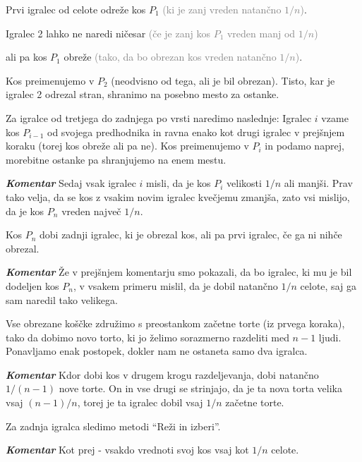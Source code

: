 \documentclass[a4paper,12pt]{article}
\begin{document}
\begin{protokol}

\item Prvi igralec od celote odreže kos $P_1$ \textcolor{gray}{(ki je zanj vreden natančno $1/n$)}.

\item Igralec 2 lahko ne naredi ničesar \textcolor{gray}{(če je zanj kos $P_1$ vreden manj od $1/n$)}

ali pa kos $P_1$ obreže \textcolor{gray}{(tako, da bo obrezan kos vreden natančno $1/n$)}.

Kos preimenujemo v $P_2$ (neodvisno od tega, ali je bil obrezan). Tisto, kar je igralec 2 odrezal stran, shranimo na posebno mesto za ostanke.

\item Za igralce od tretjega do zadnjega po vrsti naredimo naslednje: Igralec $i$ vzame kos $P_{i-1}$ od svojega predhodnika in ravna enako kot drugi igralec v prejšnjem koraku (torej kos obreže ali pa ne). Kos preimenujemo v $P_i$ in podamo naprej, morebitne ostanke pa shranjujemo na enem mestu.

\item [\textbf{\em Komentar}] Sedaj vsak igralec $i$ misli, da je kos $P_i$ velikosti $1/n$ ali manjši. Prav tako velja, da se kos z vsakim novim igralec kvečjemu zmanjša, zato vsi mislijo, da je kos $P_n$ vreden največ $1/n$.

\item Kos $P_n$ dobi zadnji igralec, ki je obrezal kos, ali pa prvi igralec, če ga ni nihče obrezal.

\item [\textbf{\em Komentar}] Že v prejšnjem komentarju smo pokazali, da bo igralec, ki mu je bil dodeljen kos $P_n$, v vsakem primeru mislil, da je dobil natančno $1/n$ celote, saj ga sam naredil tako velikega. %

\item Vse obrezane koščke združimo s preostankom začetne torte (iz prvega koraka), tako da dobimo novo torto, ki jo želimo sorazmerno razdeliti med $n - 1$ ljudi. Ponavljamo enak postopek, dokler nam ne ostaneta samo dva igralca.

\item [\textbf{\em Komentar}] Kdor dobi kos v drugem krogu razdeljevanja, dobi natančno $1/(n - 1)$ nove torte. On in vse drugi se strinjajo, da je ta nova torta velika vsaj $(n - 1)/n$, torej je ta igralec dobil vsaj $1/n$ začetne torte.

\item Za zadnja igralca sledimo metodi ``Reži in izberi''.

\item [\textbf{\em Komentar}] Kot prej - vsakdo vrednoti svoj kos vsaj kot $1/n$ celote.

\end{protokol}
\end{document}
